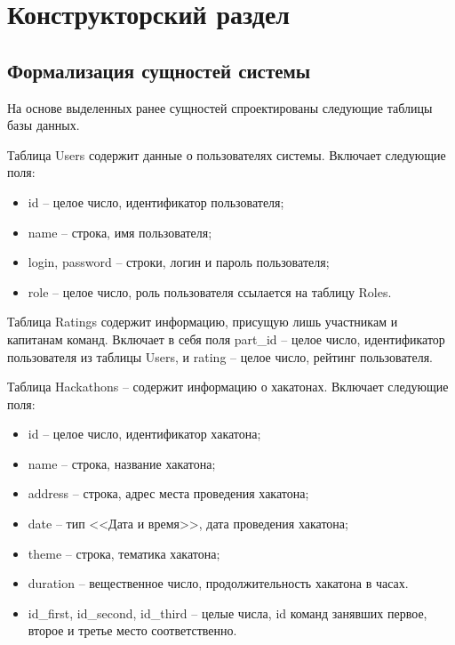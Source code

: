 \chapter{Конструкторский раздел}

\section{Формализация сущностей системы}

На основе выделенных ранее сущностей спроектированы следующие таблицы базы данных.

	 Таблица Users содержит данные о пользователях системы. Включает следующие поля:
	\begin{itemize}
            \item id -- целое число, идентификатор пользователя;
		\item name -- строка, имя пользователя;
		\item login, password -- строки, логин и пароль пользователя;
            \item role -- целое число, роль пользователя ссылается на таблицу Roles.
	\end{itemize}

    Таблица Ratings содержит информацию, присущую лишь участникам и капитанам команд. Включает в себя поля part\_id -- целое число, идентификатор пользователя из таблицы Users, и rating -- целое число, рейтинг пользователя.
 
	    Таблица Hackathons -- содержит информацию о хакатонах. Включает следующие поля:
	\begin{itemize}
            \item id -- целое число, идентификатор хакатона;
            \item name -- строка, название хакатона;
            \item address -- строка, адрес места проведения хакатона; 
		\item date --  тип <<Дата и время>>, дата проведения хакатона;
		\item theme -- строка, тематика хакатона;
            \item duration -- вещественное число, продолжительность хакатона в часах. 
            \item id\_first, id\_second, id\_third -- целые числа, id команд занявших первое, второе и третье место соответственно.
	\end{itemize}
        
